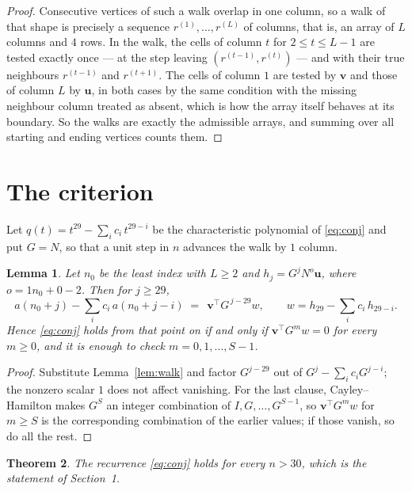 \documentclass[11pt,a4paper]{article}
\theoremstyle{plain}
\newtheorem{theorem}{Theorem}
\newtheorem{lemma}[theorem]{Lemma}
\theoremstyle{definition}
\begin{document}
\begin{proof}
Consecutive vertices of such a walk overlap in one column, so a walk of that shape is
precisely a sequence $r^{(1)},\dots,r^{(L)}$ of columns, that is, an array of $L$ columns
and $4$ rows. In the walk, the cells of column $t$ for $2\le t\le L-1$ are tested
exactly once --- at the step leaving $(r^{(t-1)},r^{(t)})$ --- and with their true
neighbours $r^{(t-1)}$ and $r^{(t+1)}$. The cells of column $1$ are tested by
$\mathbf{v}$ and those of column $L$ by $\mathbf{u}$, in both cases by the same condition
with the missing neighbour column treated as absent, which is how the array itself behaves at
its boundary. So the walks are exactly the admissible arrays, and summing over all starting
and ending vertices counts them.
\end{proof}

\section{The criterion}

Let $q(t)=t^{29}-\sum_i c_i\,t^{29-i}$ be the characteristic polynomial of
\eqref{eq:conj} and put $G=N$, so that a unit step in $n$ advances the walk by
$1$ column.

\begin{lemma}\label{lem:crit}
Let $n_0$ be the least index with $L\ge2$ and $h_j=G^{j}N^{o}\mathbf{u}$, where
$o=1n_0+0-2$. Then for $j\ge29$,
\[
a(n_0+j)-\sum_i c_i\,a(n_0+j-i)\;=\;\,\mathbf{v}^{\!\top}G^{\,j-29}w,
\qquad w=h_{29}-\sum_i c_i\,h_{29-i} .
\]
Hence \eqref{eq:conj} holds from that point on if and only if
$\mathbf{v}^{\!\top}G^{m}w=0$ for every $m\ge0$, and it is enough to check
$m=0,1,\dots,S-1$.
\end{lemma}

\begin{proof}
Substitute Lemma~\ref{lem:walk} and factor $G^{j-29}$ out of
$G^{j}-\sum_ic_iG^{j-i}$; the nonzero scalar $1$ does not affect
vanishing. For the last clause, Cayley--Hamilton makes $G^{S}$ an integer combination of
$I,G,\dots,G^{S-1}$, so $\mathbf{v}^{\!\top}G^{m}w$ for $m\ge S$ is the corresponding
combination of the earlier values; if those vanish, so do all the rest.
\end{proof}

\begin{theorem}
The recurrence \eqref{eq:conj} holds for every $n>30$, which is the statement of
Section~1.
\end{theorem}
\end{document}

